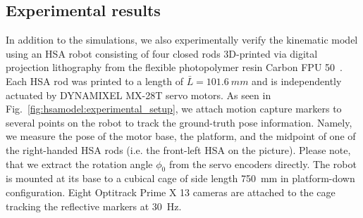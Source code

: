     

\subsection{Experimental results}\label{sub:hsamodel:kinematics:experimental_results}
In addition to the simulations, we also experimentally verify the kinematic model using an \gls{HSA} robot consisting of four closed rods 3D-printed via digital projection lithography from the flexible photopolymer resin Carbon FPU 50~\cite{truby2021recipe}. Each \gls{HSA} rod was printed to a length of $\bar{L} = \SI{101.6}{mm}$ and is independently actuated by DYNAMIXEL MX-28T servo motors.
As seen in Fig.~\ref{fig:hsamodel:experimental_setup}, we attach motion capture markers to several points on the robot to track the ground-truth pose information. Namely, we measure the pose of the motor base, the platform, and the midpoint of one of the right-handed \gls{HSA} rods (i.e. the front-left \gls{HSA} on the picture). Please note, that we extract the rotation angle $\phi_0$ from the servo encoders directly. The robot is mounted at its base to a cubical cage of side length \SI{750}{mm} in platform-down configuration. Eight Optitrack Prime X 13 cameras are attached to the cage tracking the reflective markers at \SI{30}{Hz}.

